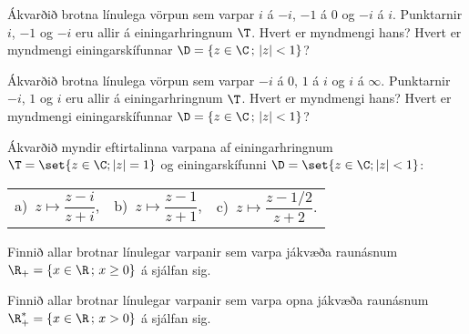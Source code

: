 \daemi  Ákvarðið brotna línulega vörpun  sem varpar $i$ á $-i$,
$-1$ á $0$ og $-i$ á $i$.  Punktarnir $i$, $-1$ og $-i$ eru allir á
einingarhringnum $\T$.  Hvert er myndmengi hans?  Hvert er myndmengi 
einingarskífunnar $\D=\{z\in \C\,;\, |z|<1\}$?


\daemi  Ákvarðið brotna línulega vörpun  sem varpar $-i$ á $0$,
$1$ á $i$ og $i$ á $\infty$.  Punktarnir $-i$, $1$ og $i$ eru allir á
einingarhringnum $\T$.  Hvert er myndmengi hans?  Hvert er myndmengi 
einingarskífunnar $\D=\{z\in \C\,;\, |z|<1\}$?

\daemi Ákvarðið myndir eftirtalinna varpana af einingarhringnum $\T=\set{z\in \C; 
|z|=1}$ og einingarskífunni $\D=\set{z\in \C;  |z|<1}$:

\smallskip
\begin{tabular}{lll}
a)\ $z\mapsto \dfrac{z-i}{z+i}$,  &
b)\ $z\mapsto \dfrac{z-1}{z+1}$,  &
c)\ $z\mapsto \dfrac{z-1/2}{z+2}$.
\end{tabular}

\daemi Finnið allar brotnar línulegar varpanir sem varpa jákvæða
raunásnum $\R_+=\{x\in \R\,;\, x\geq 0\}$ á sjálfan sig.

\daemi Finnið allar brotnar línulegar varpanir sem varpa opna jákvæða 
raunásnum $\R_+^*=\{x\in \R\,;\, x>0\}$ á sjálfan sig.


